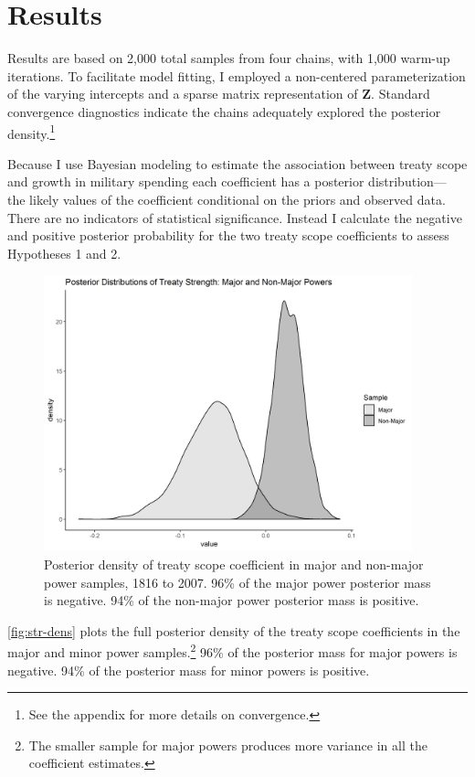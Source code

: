 \documentclass[12pt]{article}
\begin{document}
\section{Results}


Results are based on 2,000 total samples from four chains, with 1,000 warm-up iterations. 
To facilitate model fitting, I employed a non-centered parameterization of the varying intercepts and a sparse matrix representation of \textbf{Z}. 
Standard convergence diagnostics indicate the chains adequately explored the posterior density.\footnote{See the appendix for more details on convergence.} 


Because I use Bayesian modeling to estimate the association between treaty scope and growth in military spending each coefficient has a posterior distribution--- the likely values of the coefficient conditional on the priors and observed data.
There are no indicators of statistical significance. 
Instead I calculate the negative and positive posterior probability for the two treaty scope coefficients to assess Hypotheses 1 and 2.


\begin{figure}[htbp]
	\centering
		\includegraphics[width=0.95\textwidth]{../figures/str-dens.png}
	\caption{Posterior density of treaty scope coefficient in major and non-major power samples, 1816 to 2007. 96\% of the major power posterior mass is negative. 94\% of the non-major power posterior mass is positive.}
	\label{fig:str-dens}
\end{figure}


\autoref{fig:str-dens} plots the full posterior density of the treaty scope coefficients in the major and minor power samples.\footnote{The smaller sample for major powers produces more variance in all the coefficient estimates.} 
96\% of the posterior mass for major powers is negative. 
94\% of the posterior mass for minor powers is positive. 
\end{document}
